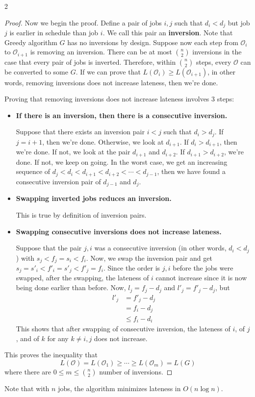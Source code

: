 \begin{multicols}{2}
\begin{proof}
    Now we begin the proof. Define a pair of jobs $i, j$ such that $d_i < d_j$ but job $j$ is earlier in schedule than job $i$. We call this pair an \textbf{inversion}. Note that Greedy algorithm $G$ has no inversions by design. Suppose now each step from $\mathcal{O}_i$ to $\mathcal{O}_{i+1}$ is removing an inversion. There can be at most ${n\choose 2}$ inversions in the case that every pair of jobs is inverted. Therefore, within ${n\choose 2}$ steps, every $\mathcal{O}$ can be converted to some $G$. If we can prove that $L(\mathcal{O}_i) \geq L(\mathcal{O}_{i+1})$, in other words, removing inversions does not increase lateness, then we're done. 

    Proving that removing inversions does not increase lateness involves $3$ steps: 
    \begin{itemize}
        \item \textbf{If there is an inversion, then there is a consecutive inversion. }

        Suppose that there exists an inversion pair $i < j$ such that $d_i > d_j$. If $j = i + 1$, then we're done. Otherwise, we look at $d_{i + 1}$. If $d_i > d_{i + 1}$, then we're done. If not, we look at the pair $d_{i + 1}$ and $d_{i + 2}$. If $d_{i + 1} > d_{i + 2}$, we're done. If not, we keep on going. In the worst case, we get an increasing sequence of $d_j < d_i < d_{i + 1} < d_{i + 2} < \cdots < d_{j - 1}$, then we have found a consecutive inversion pair of $d_{j - 1}$ and $d_j$. 
        \item \textbf{Swapping inverted jobs reduces an inversion.}

        This is true by definition of inversion pairs. 
        \item \textbf{Swapping consecutive inversions does not increase lateness.} 

        Suppose that the pair $j, i$ was a consecutive inversion (in other words, $d_i < d_j$) with $s_j < f_j = s_i < f_i$. Now, we swap the inversion pair and get $s_j = s'_i < f'_i = s'_j < f'_j = f_i$. Since the order is $j, i$ before the jobs were swapped, after the swapping, the lateness of $i$ cannot increase since it is now being done earlier than before. Now, $l_j = f_j - d_j$ and $l'_j = f'_j - d_j$, but 
        \begin{align*}
            l'_j &= f'_j - d_j \\
            &= f_i - d_j \\
            &\leq f_i - d_i
        \end{align*}
        This shows that after swapping of consecutive inversion, the lateness of $i$, of $j$, and of $k$ for any $k \neq i, j$ does not increase.
    \end{itemize}
    This proves the inequality that 
    $$L(\mathcal{O}) = L(\mathcal{O}_1) \geq \cdots\geq L(\mathcal{O}_m) = L(G)$$
    where there are $0 \leq m \leq {n \choose 2}$ number of inversions. 
\end{proof}
Note that with $n$ jobs, the algorithm minimizes lateness in $O(n \log n)$. 


\end{multicols}
